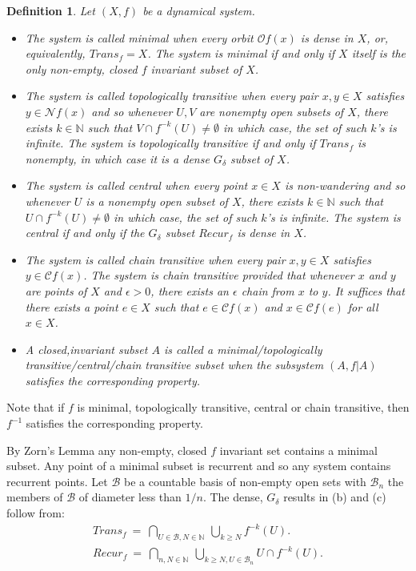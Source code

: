 \documentclass[12pt]{amsart}
\newtheorem{df}[theo]{{\bfseries Definition}}
\def \N {\mathbb N}
\def \B {\mathcal B}
\def \CC {\mathcal C}
\def \NN {\mathcal N}
\def \O {\mathcal O}
\def \ep {\epsilon}
\def \d {\delta}
\numberwithin{equation}{section}
\begin{document}
\begin{df}\label{def1.01} Let $(X,f)$ be a dynamical system.
\begin{itemize}
\item[(a)]The system is called \emph{minimal} when
 every orbit $\O f(x)$ is dense in $X$, or, equivalently,
$Trans_f = X$. The system is minimal if and only if $X$ itself is the only non-empty, closed $f$ invariant subset of $X$.

\item[(b)] The system is called \emph{topologically transitive} when every pair $x, y \in X$ satisfies $y \in \NN f(x)$ and so
whenever   $U, V$ are nonempty open subsets of $X$, there exists $k \in \N$ such that $V \cap f^{-k}(U) \not= \emptyset$
 in which case, the set of such $k$'s is infinite. The system is topologically transitive if and only if
 $Trans_f$ is nonempty, in which  case it is a dense $G_{\d}$  subset of $X$.

 \item[(c)] The system is called \emph{central} when every point $x \in X$ is non-wandering and so
 whenever $U$ is a nonempty open subset of $X$, there exists $k \in \N$ such that $U \cap f^{-k}(U) \not= \emptyset$
 in which case, the set of such $k$'s is infinite. The system is central if and only if the  $G_{\d}$ subset $Recur_f$ is dense in $X$.

 \item[(d)] The system is called \emph{chain transitive} when every pair $x, y \in X$ satisfies $y \in \CC f(x)$.
 The system is chain transitive provided that
 whenever $x$ and $y$  are points of $X$ and $\ep > 0$, there exists an $\ep$ chain from $x$ to $y$. It suffices that there
 exists a point $e \in X$ such that $e \in \CC f(x)$ and $x \in \CC f(e)$ for all $x \in X$.

 \item[(e)] A closed,invariant subset $A$ is called a minimal/topologically transitive/central/chain transitive subset when the
 subsystem $(A, f|A)$ satisfies the corresponding property.
 \end{itemize} \end{df}\vspace{.25cm}

Note that if $f$ is
  minimal, topologically transitive, central or chain transitive, then $f^{-1}$ satisfies the corresponding property.


 By Zorn's Lemma any non-empty, closed $f$ invariant set contains a minimal subset. Any point of a minimal subset is recurrent and so
 any system contains recurrent points. Let $\B$ be a countable basis of non-empty open sets with $\B_n$ the members of $\B$ of diameter
 less than $1/n$. The dense, $G_{\d}$ results in (b) and (c) follow from:
 \begin{equation}\label{eq1.10}\begin{split}
 Trans_f \ = \ \bigcap_{U \in \B, N \in \N} \ \bigcup_{k \ge N} f^{-k}(U). \hspace{1cm}\\
Recur_f \ = \ \bigcap_{n, N \in \N} \ \bigcup_{k \ge N, U \in \B_n} U \cap f^{-k}(U).
 \end{split}\end{equation}
\end{document}
